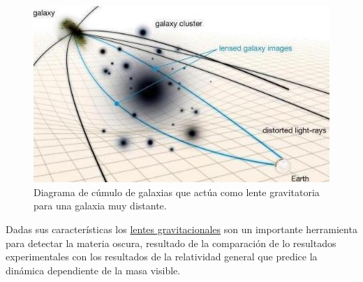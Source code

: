 \begin{figure}[htbp]
\centering
\includegraphics[width=.6\textwidth]{Fisica_de_Particulas/imagenes/lentes.jpg}
\caption[Diagrama de cúmulo de galaxias que actúa como lente gravitatoria para una galaxia muy distante.]{Diagrama de cúmulo de galaxias que actúa como lente gravitatoria para una galaxia muy distante.\footnotemark}
\label{lentes}
\end{figure}



Dadas sus características los \href{https://curiosoando.com/introduccion-a-las-lentes-gravitacionales}{lentes gravitacionales} son un importante herramienta para detectar la materia oscura, resultado de la comparación de lo resultados experimentales con los resultados de la relatividad general que predice la dinámica dependiente de la masa visible.


